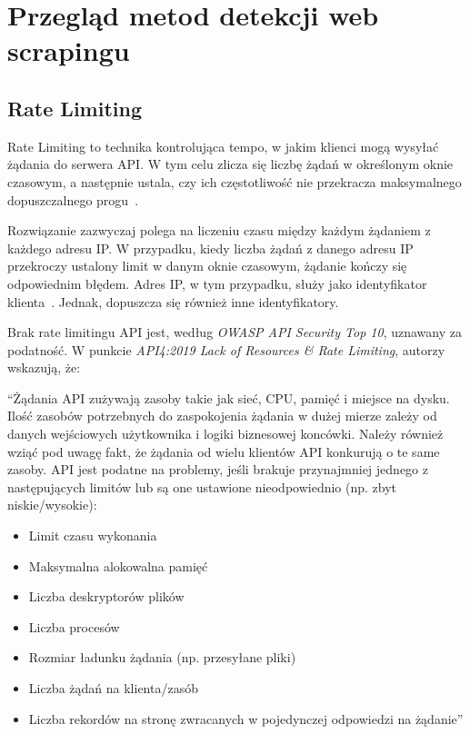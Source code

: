 \newpage


\section{Przegląd metod detekcji web scrapingu}\label{sec:przeglad-rozwiazan}

\subsection{Rate Limiting}\label{subsec:rate-limiting}

Rate Limiting to technika kontrolująca tempo, w jakim klienci mogą wysyłać żądania do serwera API\@.
W tym celu zlicza się liczbę żądań w określonym oknie czasowym, a następnie ustala, czy ich częstotliwość nie przekracza maksymalnego dopuszczalnego progu~\cite{api-rate-limit-adoption}.

Rozwiązanie zazwyczaj polega na liczeniu czasu między każdym żądaniem z każdego adresu IP\@.
W przypadku, kiedy liczba żądań z danego adresu IP przekroczy ustalony limit w danym oknie czasowym, żądanie kończy się odpowiednim błędem.
Adres IP, w tym przypadku, służy jako identyfikator klienta~\cite{cloudflare-what-is-rate-limiting}.
Jednak, dopuszcza się również inne identyfikatory.

Brak rate limitingu API jest, według \emph{OWASP API Security Top 10}, uznawany za podatność.
W punkcie \emph{API4:2019 Lack of Resources \& Rate Limiting}, autorzy wskazują, że:\@
\begin{displayquote}
    ``Żądania API zużywają zasoby takie jak sieć, CPU, pamięć i miejsce na dysku.
    Ilość zasobów potrzebnych do zaspokojenia żądania w dużej mierze zależy od danych wejściowych użytkownika i logiki biznesowej koncówki.
    Należy również wziąć pod uwagę fakt, że żądania od wielu klientów API konkurują o te same zasoby.
    API jest podatne na problemy, jeśli brakuje przynajmniej jednego z następujących limitów lub są one ustawione nieodpowiednio (np. zbyt niskie/wysokie):

    \begin{itemize}
        \item Limit czasu wykonania
        \item Maksymalna alokowalna pamięć
        \item Liczba deskryptorów plików
        \item Liczba procesów
        \item Rozmiar ładunku żądania (np. przesyłane pliki)
        \item Liczba żądań na klienta/zasób
        \item Liczba rekordów na stronę zwracanych w pojedynczej odpowiedzi na żądanie''
    \end{itemize}
\end{displayquote}

